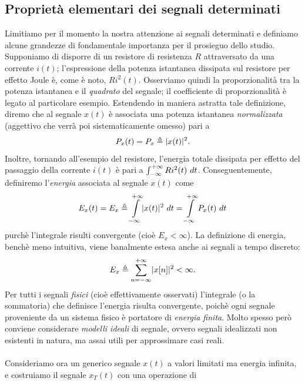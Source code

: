\documentclass[12pt,oneside,openany]{memoir}
\numberwithin{equation}{subsection}
\DeclarePairedDelimiter{\abs}{\lvert}{\rvert}
\newcommand{\dt}{\ dt}
\begin{document}
\subsection{Propriet\`a elementari dei segnali determinati}
Limitiamo per il momento la nostra attenzione ai segnali determinati e definiamo
alcune grandezze di fondamentale importanza per il prosieguo dello studio.
Supponiamo di disporre di un resistore di resistenza $R$ attraversato da una
corrente $i(t)$; l'espressione della potenza istantanea dissipata sul resistore
per effetto Joule \`e, come \`e noto, $Ri^2(t)$. Osserviamo quindi la
proporzionalit\`a tra la potenza istantanea e il \textit{quadrato} del segnale;
il coefficiente di proporzionalit\`a \`e legato al particolare esempio.
Estendendo in maniera astratta tale definizione, diremo che al segnale $x(t)$
\`e associata una potenza istantanea \textit{normalizzata} (aggettivo che
verr\`a poi sistematicamente omesso) pari a
\begin{equation}
	P_x(t) = P_x \triangleq \abs{x(t)}^2.
\end{equation}
Inoltre, tornando all'esempio del resistore, l'energia totale dissipata per
effetto del passaggio della corrente $i(t)$ \`e pari a
$\int\displaylimits_{-\infty}^{+\infty} Ri^2(t) \dt$. Conseguentemente,
definiremo l'\textit{energia} associata al segnale $x(t)$ come
\begin{equation}
	E_x(t) = E_x \triangleq \int\displaylimits_{-\infty}^{+\infty}
	\abs{x(t)}^2 \dt = \int\displaylimits_{-\infty}^{+\infty} P_x(t) \dt
\end{equation}
purch\`e l'integrale risulti convergente (cio\`e $E_x < \infty$). La definizione
di energia, bench\`e meno intuitiva, viene banalmente estesa anche ai segnali a
tempo discreto:
\begin{equation}
	E_x \triangleq \sum_{n = -\infty}^{+\infty} \abs{x[n]}^2 < \infty.
\end{equation}
Per tutti i segnali \textit{fisici} (cio\`e effettivamente osservati)
l'integrale (o la sommatoria) che definisce l'energia risulta convergente,
poich\`e ogni segnale proveniente da un sistema fisico \`e portatore di
\textit{energia finita}. Molto spesso per\`o conviene considerare
\textit{modelli ideali} di segnale, ovvero segnali idealizzati non esistenti in
natura, ma assai utili per approssimare casi reali.\\
\\
Consideriamo ora un generico segnale $x(t)$ a valori limitati ma energia
infinita, e costruiamo il segnale $x_T(t)$ con una operazione di
\end{document}

